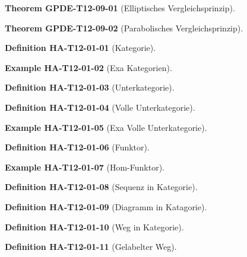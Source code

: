 \documentclass[10pt, letterpaper]{article}
\newcommand{\CustomHeading}[3]{%
  \par\medskip\noindent%
  \textbf{#1 #2} \textnormal{(#3)}.\enskip%
}
\newenvironment{DEF}[2]{\CustomHeading{Definition}{#1}{#2}}{}
\newenvironment{THEO}[2]{\CustomHeading{Theorem}{#1}{#2}}{}
\newenvironment{EXA}[2]{\CustomHeading{Example}{#1}{#2}}{}
\begin{document}
\begin{THEO}{GPDE-T12-09-01}{Elliptisches Vergleichsprinzip}
\end{THEO}

\begin{THEO}{GPDE-T12-09-02}{Parabolisches Vergleichsprinzip}
\end{THEO}

\begin{DEF}{HA-T12-01-01}{Kategorie}
\end{DEF}

\begin{EXA}{HA-T12-01-02}{Exa Kategorien}
\end{EXA}

\begin{DEF}{HA-T12-01-03}{Unterkategorie}
\end{DEF}

\begin{DEF}{HA-T12-01-04}{Volle Unterkategorie}
\end{DEF}

\begin{EXA}{HA-T12-01-05}{Exa Volle Unterkategorie}
\end{EXA}

\begin{DEF}{HA-T12-01-06}{Funktor}
\end{DEF}

\begin{EXA}{HA-T12-01-07}{Hom-Funktor}
\end{EXA}

\begin{DEF}{HA-T12-01-08}{Sequenz in Kategorie}
\end{DEF}

\begin{DEF}{HA-T12-01-09}{Diagramm in Katagorie}
\end{DEF}

\begin{DEF}{HA-T12-01-10}{Weg in Kategorie}
\end{DEF}

\begin{DEF}{HA-T12-01-11}{Gelabelter Weg}
\end{DEF}
\end{document}
